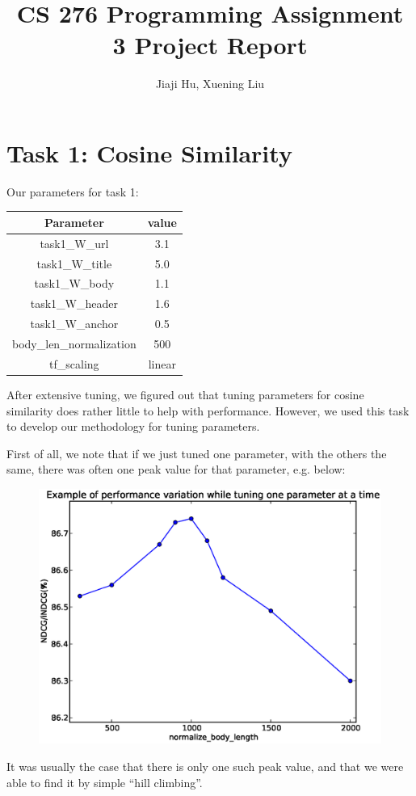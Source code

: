\documentclass[10pt,twocolumn]{article}
\begin{document}
\title{CS 276 Programming Assignment 3 Project Report}
\author{Jiaji Hu, Xuening Liu}
\date{}
\maketitle

\section*{Task 1: Cosine Similarity}
Our parameters for task 1:
\begin{table}[H]
\centering
\begin{tabular}{|c|c|}
\hline
Parameter & value \\\hline
task1\_W\_url & 3.1\\\hline
task1\_W\_title & 5.0\\\hline
task1\_W\_body & 1.1\\\hline
task1\_W\_header & 1.6\\\hline
task1\_W\_anchor & 0.5\\\hline
body\_len\_normalization & 500\\\hline
tf\_scaling & linear\\\hline
\end{tabular}
\end{table}
After extensive tuning, we figured out that tuning parameters for cosine similarity does rather little to help with performance. However, we used this task to develop our methodology for tuning parameters.

First of all, we note that if we just tuned one parameter, with the others the same, there was often one peak value for that parameter, e.g. below:
\begin{figure}[H]
\centering
\includegraphics[width=0.6\linewidth]{fig1}
\end{figure}
It was usually the case that there is only one such peak value, and that we were able to find it by simple ``hill climbing''.
\end{document}
